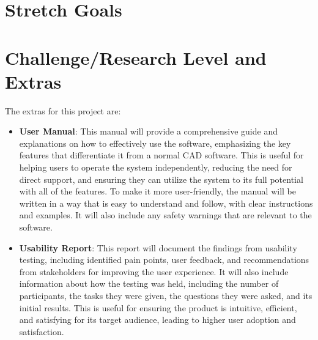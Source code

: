 \documentclass{article}
\begin{document}
\section{Stretch Goals}

\section{Challenge/Research Level and Extras}

%
%
The extras for this project are:

\begin{itemize}
    \item \textbf{User Manual}: This manual will provide a comprehensive guide and explanations on how to effectively use the software, emphasizing the key features that differentiate it from a normal CAD software. This is useful for helping users to operate the system independently, reducing the need for direct support, and ensuring they can utilize the system to its full potential with all of the features. To make it more user-friendly, the manual will be written in a way that is easy to understand and follow, with clear instructions and examples. It will also include any safety warnings that are relevant to the software.
    \item \textbf{Usability Report}: This report will document the findings from usability testing, including identified pain points, user feedback, and recommendations from stakeholders for improving the user experience. It will also include information about how the testing was held, including the number of participants, the tasks they were given, the questions they were asked, and its initial results. This is useful for ensuring the product is intuitive, efficient, and satisfying for its target audience, leading to higher user adoption and satisfaction.
\end{itemize}
\newpage{}
\end{document}
